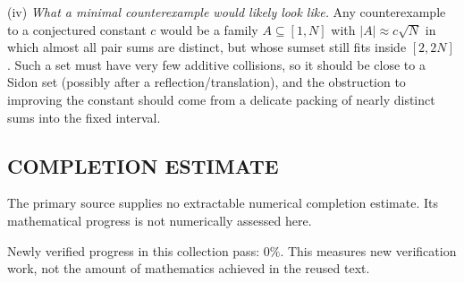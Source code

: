(iv) \emph{What a minimal counterexample would likely look like.} Any counterexample to a conjectured constant $c$ would be a family $A\subseteq[1,N]$ with $|A|\approx c\sqrt N$ in which almost all pair sums are distinct, but whose sumset still fits inside $[2,2N]$. Such a set must have very few additive collisions, so it should be close to a Sidon set (possibly after a reflection/translation), and the obstruction to improving the constant should come from a delicate packing of nearly distinct sums into the fixed interval.



\subsection*{COMPLETION ESTIMATE}
The primary source supplies no extractable numerical completion estimate. Its mathematical progress is not numerically assessed here.

Newly verified progress in this collection pass: $0\%$. This measures new verification work, not the amount of mathematics achieved in the reused text.
